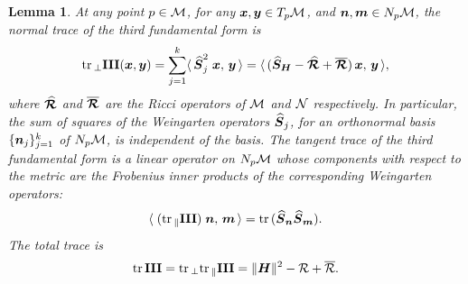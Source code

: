\documentclass[letterpaper, reqno, 11pt]{amsart}
\newtheorem{lemma}[theorem]{Lemma}
\theoremstyle{definition}
\theoremstyle{remark}
\numberwithin{equation}{section}
\begin{document}
\begin{lemma}\label{lem:trnIII}
At any point $p\in{\mathcal M}$, for any $\boldsymbol{x},\boldsymbol{y}\in T_p{\mathcal M}$, and $\boldsymbol{n},\boldsymbol{m}\in N_p{\mathcal M}$, the normal trace of the third fundamental form is
\begin{equation}
	\mathrm{tr}\,_\perp\boldsymbol{\mathrm{III}} (\boldsymbol{x},\boldsymbol{y}) =  \sum_{j=1}^k\langle\,\boldsymbol{\widehat{S}}_j^2\;\boldsymbol{x},\,\boldsymbol{y} \,\rangle = \langle\, (\boldsymbol{\widehat{S}_H}-\boldsymbol{\widehat{\mathcal{R}}}+\overline{\boldsymbol{\mathcal{R}}})\,\boldsymbol{x},\,\boldsymbol{y} \,\rangle ,
\end{equation}
where $\boldsymbol{\widehat{\mathcal{R}}}$ and $\overline{\boldsymbol{\mathcal{R}}}$ are the Ricci operators of ${\mathcal M}$ and $\mathcal{N}$ respectively. In particular, the sum of squares of the Weingarten operators $\boldsymbol{\widehat{S}}_j$, for an orthonormal basis $\{\boldsymbol{n}_j\}_{j=1}^k$ of $N_p{\mathcal M}$, is independent of the basis. The tangent trace of the third fundamental form is a linear operator on $N_p{\mathcal M}$ whose components with respect to the metric are the Frobenius inner products of the corresponding Weingarten operators:
\begin{equation}
	\langle\; (\mathrm{tr}\,_\parallel\boldsymbol{\mathrm{III}})\;\boldsymbol{n},\,\boldsymbol{m}\,\rangle = \mathrm{tr}\,(\boldsymbol{\widehat{S}}_{\boldsymbol{n}}\boldsymbol{\widehat{S}}_{\boldsymbol{m}}).
\end{equation}
The total trace is
\begin{equation}\label{eq:trIII}
	\mathrm{tr}\,\boldsymbol{\mathrm{III}} = \mathrm{tr}\,_\perp\mathrm{tr}\,_\parallel\boldsymbol{\mathrm{III}} = \|\boldsymbol{H}\|^2 -\mathcal{R} +\overline{\mathcal{R}}.
\end{equation}
\end{lemma}
\end{document}
